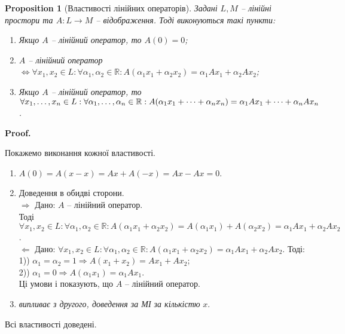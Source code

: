\documentclass[a4paper, 10pt]{article}
\makeatletter
\def\rightproof{$\boxed{\Rightarrow}$ }
\def\leftproof{$\boxed{\Leftarrow}$ }
\theoremstyle{theoremdd}
\newtheorem{proposition}[theorem]{Proposition}
\renewenvironment{proof}[1][Proof.\\]{\par
\pushQED{\hfill \qed}%
\normalfont \topsep6\p@\@plus6\p@\relax
\trivlist
\item\relax
{\bfseries
#1\@addpunct{.}}\hspace\labelsep\ignorespaces
}{%
\popQED\endtrivlist\@endpefalse
}
\makeatother
\begin{document}
	\begin{proposition}[Властивості лінійних операторів]
	Задані $L,M$ -- лінійні простори та $A \colon L \to M$ -- відображення. Тоді виконуються такі пункти:
	\begin{enumerate}[nosep, wide=0pt, label={\arabic*)}]
	\item Якщо $A$ -- лінійний оператор, то $A(0) = 0$;
	\item $A$ -- лінійний оператор $\iff \forall x_1,x_2 \in L: \forall \alpha_1, \alpha_2 \in \mathbb{R}: A(\alpha_1 x_1 + \alpha_2 x_2) = \alpha_1 Ax_1 + \alpha_2 Ax_2$;
	\item Якщо $A$ -- лінійний оператор, то $\forall x_1,\dots, x_n \in L: \forall \alpha_1, \dots, \alpha_n \in \mathbb{R}: \\ A(\alpha_1 x_1 + \dots + \alpha_n x_n) = \alpha_1 Ax_1 + \dots + \alpha_n Ax_n$.
	\end{enumerate}
	\end{proposition}
	
	\begin{proof}
	Покажемо виконання кожної властивості.
	\begin{enumerate}[topsep=-\parskip, wide=0pt, label={\arabic*)}]
	\item $A(0) = A(x - x) = Ax + A(-x) = Ax - Ax = 0$.
	\item Доведення в обидві сторони.\\
	\rightproof Дано: $A$ -- лінійний оператор.\\
	Тоді $\forall x_1,x_2 \in L: \forall \alpha_1, \alpha_2 \in \mathbb{R}: A(\alpha_1 x_1 + \alpha_2 x_2) = A(\alpha_1 x_1) + A(\alpha_2 x_2) = \alpha_1 Ax_1 + \alpha_2 Ax_2$.
	\bigskip \\
	\leftproof Дано: $\forall x_1,x_2 \in L: \forall \alpha_1, \alpha_2 \in \mathbb{R}: A(\alpha_1 x_1 + \alpha_2 x_2) = \alpha_1 Ax_1 + \alpha_2 Ax_2$. Тоді:\\
	1)) $\alpha_1 = \alpha_2 = 1 \Rightarrow A(x_1 + x_2) = Ax_1 + Ax_2$;\\
	2)) $\alpha_1 = 0 \Rightarrow A(\alpha_1 x_1) = \alpha_1 Ax_1$.\\
	Ці умови і показують, що $A$ -- лінійний оператор.
	\item \textit{випливає з другого, доведення за МІ за кількістю} $x$.
	\end{enumerate}
	Всі властивості доведені.
	\end{proof}
	
\end{document}
